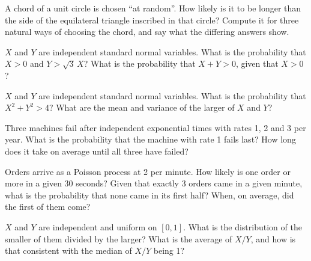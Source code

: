\begin{question}\label{iq:iv1:continuous-and-geometric-probability:11}
A chord of a unit circle is chosen ``at random''. How likely is it to be longer than the side of the equilateral triangle inscribed in that circle? Compute it for three natural ways of choosing the chord, and say what the differing answers show.
\end{question}

\begin{question}\label{iq:iv1:continuous-and-geometric-probability:12}
$X$ and $Y$ are independent standard normal variables. What is the probability that $X > 0$ and $Y > \sqrt{3}\,X$? What is the probability that $X + Y > 0$, given that $X > 0$?
\end{question}

\begin{question}\label{iq:iv1:continuous-and-geometric-probability:13}
$X$ and $Y$ are independent standard normal variables. What is the probability that $X^2 + Y^2 > 4$? What are the mean and variance of the larger of $X$ and $Y$?
\end{question}

\begin{question}\label{iq:iv1:continuous-and-geometric-probability:14}
Three machines fail after independent exponential times with rates 1, 2 and 3 per year. What is the probability that the machine with rate 1 fails last? How long does it take on average until all three have failed?
\end{question}

\begin{question}\label{iq:iv1:continuous-and-geometric-probability:15}
Orders arrive as a Poisson process at 2 per minute. How likely is one order or more in a given 30 seconds? Given that exactly 3 orders came in a given minute, what is the probability that none came in its first half? When, on average, did the first of them come?
\end{question}

\begin{question}\label{iq:iv1:continuous-and-geometric-probability:16}
$X$ and $Y$ are independent and uniform on $[0, 1]$. What is the distribution of the smaller of them divided by the larger? What is the average of $X/Y$, and how is that consistent with the median of $X/Y$ being 1?
\end{question}

